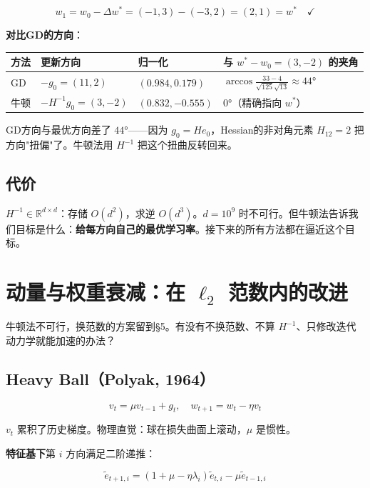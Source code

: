 \documentclass[12pt,a4paper]{article}
\begin{document}
\[w_1 = w_0 - \Delta w^* = (-1, 3) - (-3, 2) = (2, 1) = w^* \quad \checkmark\]

\textbf{对比GD的方向}：





\begin{center}\small
\begin{longtable}{|l|l|l|l|}
\hline
方法 & 更新方向 & 归一化 & 与 $w^*-w_0=(3,-2)$ 的夹角 \\
\hline
GD & $-g_0 = (11, 2)$ & $(0.984, 0.179)$ & $\arccos\frac{33-4}{\sqrt{125}\sqrt{13}} \approx 44°$ \\
牛顿 & $-H^{-1}g_0 = (3, -2)$ & $(0.832, -0.555)$ & $0°$（精确指向 $w^*$） \\
\hline
\end{longtable}
\end{center}


GD方向与最优方向差了 $44°$——因为 $g_0 = He_0$，Hessian的非对角元素 $H_{12}=2$ 把方向"扭偏"了。牛顿法用 $H^{-1}$ 把这个扭曲反转回来。


\subsection{代价}

$H^{-1} \in \mathbb{R}^{d \times d}$：存储 $O(d^2)$，求逆 $O(d^3)$。$d = 10^9$ 时不可行。但牛顿法告诉我们目标是什么：\textbf{给每方向自己的最优学习率}。接下来的所有方法都在逼近这个目标。




\section{动量与权重衰减：在 $\ell_2$ 范数内的改进}

牛顿法不可行，换范数的方案留到§5。有没有不换范数、不算 $H^{-1}$、只修改迭代动力学就能加速的办法？


\subsection{Heavy Ball（Polyak, 1964）}


\[v_t = \mu v_{t-1} + g_t, \quad w_{t+1} = w_t - \eta v_t\]

$v_t$ 累积了历史梯度。物理直觉：球在损失曲面上滚动，$\mu$ 是惯性。

\textbf{特征基下}第 $i$ 方向满足二阶递推：


\[\tilde{e}_{t+1,i} = (1 + \mu - \eta\lambda_i)\tilde{e}_{t,i} - \mu\tilde{e}_{t-1,i}\]
\end{document}
